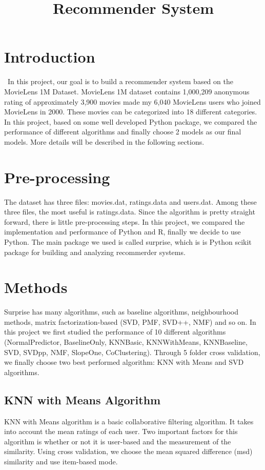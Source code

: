 \documentclass[12pt]{article}
\title{Recommender System}
\begin{document}
%
\maketitle

\section{Introduction}
\quad\ In this project, our goal is to build a recommender system based on the MovieLens 1M Dataset. MovieLens 1M dataset contains 1,000,209 anonymous rating of approximately 3,900 movies made my 6,040 MovieLens users who joined MovieLens in 2000. These movies can be categorized into 18 different categories. In this project, based on some well developed Python package, we compared the performance of different algorithms and finally choose 2 models as our final models. More details will be described in the following sections.

\section{Pre-processing}
The dataset has three files: movies.dat, ratings.data and users.dat. Among these three files, the most useful is ratings.data. Since the algorithm is pretty straight forward, there is little pre-processing steps. In this project, we compared the implementation and performance of Python and R, finally we decide to use Python. The main package we used is called surprise, which is is Python scikit package for building and analyzing recommerder systems.

\section{Methods}

Surprise has many algorithms, such as baseline algorithms, neighbourhood methods, matrix factorization-based (SVD, PMF, SVD++, NMF) and so on. In this project we first studied the performance of 10 different algorithms (NormalPredictor, BaselineOnly, KNNBasic, KNNWithMeans, KNNBaseline, SVD, SVDpp, NMF, SlopeOne, CoClustering). Through 5 folder cross validation, we finally choose two best performed algorithm: KNN with Means and SVD algorithms.

\subsection{KNN with Means Algorithm}
KNN with Means algorithm is a basic collaborative filtering algorithm. It takes into account the mean ratings of each user. Two important factors for this algorithm is whether or not it is user-based and the measurement of the similarity. Using cross validation, we choose the mean squared difference (msd) similarity and use item-based mode.
\end{document}
